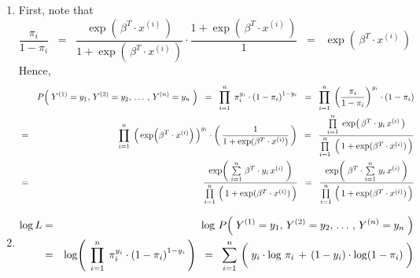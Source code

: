 \begin{enumerate}
\item
	First, note that
	\begin{equation*}
	\dfrac{\pi_{i}}{1 - \pi_{i}}
	\;\; = \;\;
		\dfrac{\exp\!\left(\,\beta^{T} \cdot x^{(i)}\,\right)}{1 + \exp\!\left(\,\beta^{T} \cdot x^{(i)}\,\right)}
		\cdot
		\dfrac{1 + \exp\!\left(\,\beta^{T} \cdot x^{(i)}\,\right)}{1}
	\;\; = \;\;
		\exp\!\left(\,\beta^{T} \cdot x^{(i)}\,\right)
	\end{equation*}
	Hence,
	\begin{eqnarray*}
	&&
		P\!\left(\;Y^{(1)} = y_{1},\,Y^{(2)} = y_{2},\,\ldots\,,\,Y^{(n)} = y_{n}\;\right)
	\;\; = \;\;
		\overset{n}{\underset{i=1}{\prod}}\;\, \pi_{i}^{y_{i}} \cdot \left(1 - \pi_{i}\right)^{1-y_{i}}
	\;\; = \;\;
		\overset{n}{\underset{i=1}{\prod}}\; \left(\dfrac{\pi_{i}}{1-\pi_{i}}\right)^{y_{i}} \cdot \left(1 - \pi_{i}\right)
	\\
	&=&
		\overset{n}{\underset{i=1}{\prod}}\;
			\left(\, \exp\!\left(\beta^{T}\cdot x^{(i)}\right) \,\right)^{y_{i}}
			\cdot
			\left(\, \dfrac{1}{1+\exp(\beta^{T}\cdot x^{(i)})} \,\right)
	\;\; = \;\;
		\dfrac{
			\overset{n}{\underset{i=1}{\prod}}\;\exp\!\left(\,\beta^{T}\cdot y_{i}\,x^{(i)}\,\right)
		}{
			\overset{n}{\underset{i=1}{\prod}}\;\left(\,\overset{{\color{white}.}}{1} + \exp(\beta^{T}\cdot x^{(i)}) \,\right)
		}
	\\
	&=&
		\dfrac{
			\exp\!\left(\; \overset{n}{\underset{i=1}{\sum}}\;\beta^{T}\cdot y_{i}\,x^{(i)} \;\right)
		}{
			\overset{n}{\underset{i=1}{\prod}}\,\left(\,\overset{{\color{white}.}}{1} + \exp(\beta^{T}\cdot x^{(i)}) \,\right)
		}
	\;\; = \;\;
		\dfrac{
			\exp\!\left(\; \beta^{T} \cdot \overset{n}{\underset{i=1}{\sum}}\;y_{i}\,x^{(i)} \,\right)
		}{
			\overset{n}{\underset{i=1}{\prod}}\,\left(\,\overset{{\color{white}.}}{1} + \exp(\beta^{T}\cdot x^{(i)}) \,\right)
		}
	\end{eqnarray*}
\item
	\begin{eqnarray*}
	\log L
	&=&
		\log\,P\!\left(\;Y^{(1)} = y_{1},\,Y^{(2)} = y_{2},\,\ldots\,,\,Y^{(n)} = y_{n}\;\right)
	\\
	&=&
		\log\!\left(\;\,
			\overset{n}{\underset{i=1}{\prod}}\;\, \pi_{i}^{y_{i}} \cdot \left(1 - \pi_{i}\right)^{1-y_{i}}
			\,\right)
	\;\;=\;\;
		\overset{n}{\underset{i=1}{\sum}}\,
		\left(\;
			y_{i}\cdot\log\,\pi_{i}
			\, \overset{{\color{white}\vert}}{+} \,
			(1-y_{i})\cdot\log\!\left(1 - \pi_{i}\right)
			\;\right)	
	\\

\end{eqnarray*}
\end{enumerate}
